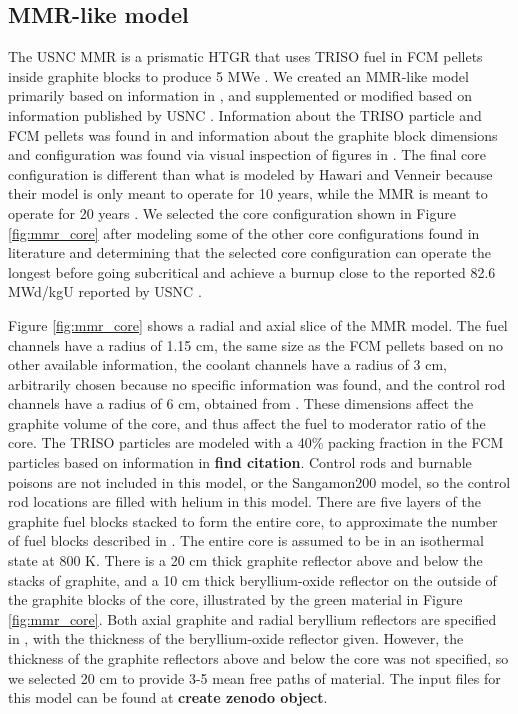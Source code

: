 \subsection{MMR-like model}
The \gls{USNC} \gls{MMR} is a prismatic \gls{HTGR} that uses 
\gls{TRISO} fuel in \acrfull{FCM} pellets inside graphite blocks 
to produce 5 MWe \cite{noauthor_usnc_2021}.
We created an \gls{MMR}-like model primarily based on information in 
\cite{hawari_development_2018}, and supplemented or modified based on 
information published by \gls{USNC} \cite{noauthor_usnc_2021}. 
Information about the \gls{TRISO} 
particle and \gls{FCM} pellets was found in \cite{noauthor_usnc_2021}
and information about the graphite block dimensions and configuration 
was found via visual inspection of figures in \cite{venneri_micro_2019}. 
The final core configuration 
is different than what is modeled by Hawari and Venneir \cite{hawari_development_2018} 
because their model is only meant to operate 
for 10 years, while the \gls{MMR} is meant to operate for 20 years 
\cite{noauthor_usnc_2021}. We selected the core configuration shown in 
Figure \ref{fig:mmr_core} after modeling some of the other core 
configurations found in literature \cite{mitchell_usnc_2020,hawari_development_2018}
and determining that the selected core configuration  
can operate the longest before going subcritical and 
achieve a burnup close to the reported 82.6 MWd/kgU reported by 
\gls{USNC} \cite{noauthor_usnc_2021}. 

Figure \ref{fig:mmr_core} shows a radial and axial slice of the 
\gls{MMR} model. The fuel channels have a radius of 1.15 cm, the same
size as the \gls{FCM} pellets based on no other available information, 
the coolant channels have a radius of 
3 cm, arbitrarily chosen because no specific information was found, 
and the control rod channels have a radius of 6 cm, obtained from 
\cite{hawari_development_2018}. These dimensions affect the graphite volume 
of the core, and thus affect the fuel to moderator ratio of the core. 
The \gls{TRISO} particles are modeled with a 40\% packing fraction in 
the \gls{FCM} particles based on information in \textbf{find citation}.
Control rods and burnable poisons are not included in this model, or 
the Sangamon200 model, so the control rod locations are filled with helium
in this model. There are five layers of the graphite fuel blocks 
stacked to form the entire core, to approximate the number of 
fuel blocks described in \cite{noauthor_usnc_2021}. The entire core 
is assumed to be in an isothermal state at 800 K. There is a 20 cm 
thick graphite reflector above and below the stacks of graphite, 
and a 10 cm thick beryllium-oxide reflector on the outside of the 
graphite blocks of the core, illustrated by the green material in 
Figure \ref{fig:mmr_core}. Both axial graphite and radial 
beryllium reflectors are specified 
in \cite{hawari_development_2018}, with the thickness of the 
beryllium-oxide reflector given. However, the thickness of the graphite 
reflectors above and below the core was not specified, so we selected 
20 cm to provide 3-5 mean free paths of material. 
The input files for this model can be found at \textbf{create zenodo 
object}.

